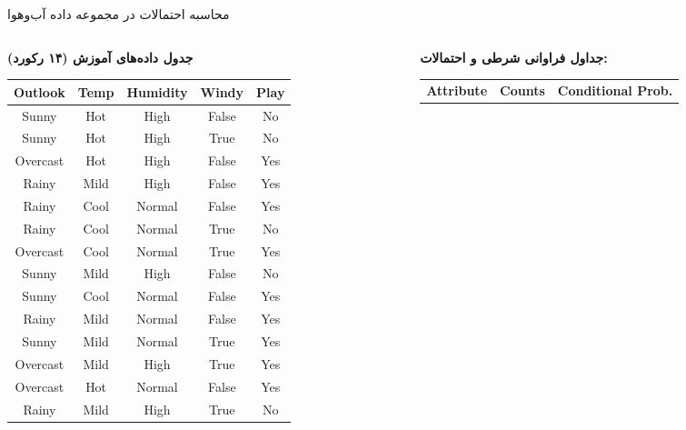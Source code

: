 \begin{frame}{محاسبه احتمالات در مجموعه داده آب‌وهوا}{}
  \centering
  \scriptsize
  \setlength{\tabcolsep}{3pt}
  \begin{columns}[T]
    \begin{column}{0.44\textwidth}
      \textbf{جدول داده‌های آموزش (۱۴ رکورد)}\\[0.1cm]
      \begin{latin}
      \begin{tabular}{|c|c|c|c|c|}
        \hline
        \textbf{Outlook} & \textbf{Temp} & \textbf{Humidity} & \textbf{Windy} & \textbf{Play} \\
        \hline
        Sunny & Hot & High & False & No \\
        Sunny & Hot & High & True & No \\
        Overcast & Hot & High & False & Yes \\
        Rainy & Mild & High & False & Yes \\
        Rainy & Cool & Normal & False & Yes \\
        Rainy & Cool & Normal & True & No \\
        Overcast & Cool & Normal & True & Yes \\
        Sunny & Mild & High & False & No \\
        Sunny & Cool & Normal & False & Yes \\
        Rainy & Mild & Normal & False & Yes \\
        Sunny & Mild & Normal & True & Yes \\
        Overcast & Mild & High & True & Yes \\
        Overcast & Hot & Normal & False & Yes \\
        Rainy & Mild & High & True & No \\
        \hline
      \end{tabular}
      \end{latin}
    \end{column}
    \begin{column}{0.54\textwidth}
      \textbf{جداول فراوانی شرطی و احتمالات:}\\[0.1cm]
      \begin{latin}
      \begin{tabular}{|l|cc|cc|}
        \hline
        \multirow{2}{*}{\textbf{Attribute}} & \multicolumn{2}{c|}{\textbf{Counts}} & \multicolumn{2}{c|}{\textbf{Conditional Prob.}} \\

\end{tabular}
\end{latin}
\end{column}
\end{columns}
\end{frame}

